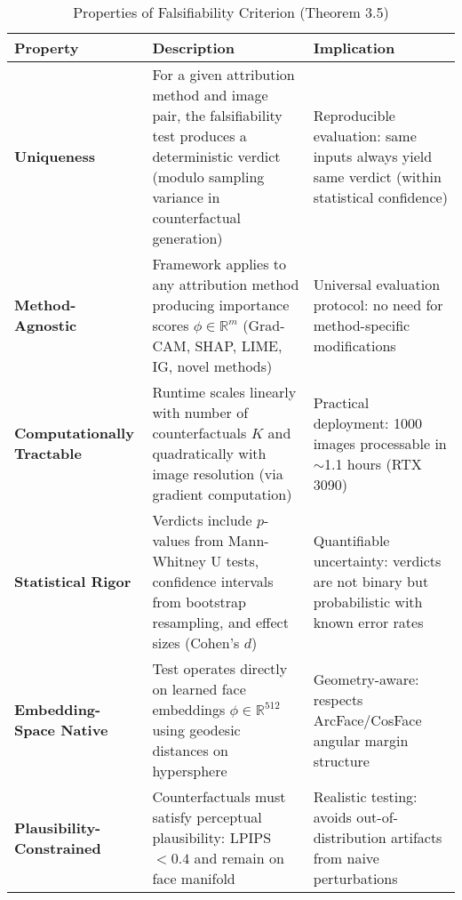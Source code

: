 
\begin{table}[htbp]
\centering
\caption{Properties of Falsifiability Criterion (Theorem 3.5)}
\label{tab:theorem_properties}
\small
\begin{tabularx}{\textwidth}{lXp{}}
\toprule
\textbf{Property} & \textbf{Description} & \textbf{Implication} \\
\midrule
\textbf{Uniqueness} & For a given attribution method and image pair, the falsifiability test produces a deterministic verdict (modulo sampling variance in counterfactual generation) & Reproducible evaluation: same inputs always yield same verdict (within statistical confidence) \\[8pt]

\textbf{Method-Agnostic} & Framework applies to any attribution method producing importance scores $\phi \in \mathbb{R}^m$ (Grad-CAM, SHAP, LIME, IG, novel methods) & Universal evaluation protocol: no need for method-specific modifications \\[8pt]

\textbf{Computationally Tractable} & Runtime scales linearly with number of counterfactuals $K$ and quadratically with image resolution (via gradient computation) & Practical deployment: 1000 images processable in $\sim$1.1 hours (RTX 3090) \\[8pt]

\textbf{Statistical Rigor} & Verdicts include $p$-values from Mann-Whitney U tests, confidence intervals from bootstrap resampling, and effect sizes (Cohen's $d$) & Quantifiable uncertainty: verdicts are not binary but probabilistic with known error rates \\[8pt]

\textbf{Embedding-Space Native} & Test operates directly on learned face embeddings $\phi \in \mathbb{R}^{512}$ using geodesic distances on hypersphere & Geometry-aware: respects ArcFace/CosFace angular margin structure \\[8pt]

\textbf{Plausibility-Constrained} & Counterfactuals must satisfy perceptual plausibility: LPIPS $< 0.4$ and remain on face manifold & Realistic testing: avoids out-of-distribution artifacts from naive perturbations \\

\bottomrule
\end{tabularx}
\end{table}


